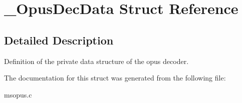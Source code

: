 \section{\-\_\-\-Opus\-Dec\-Data Struct Reference}
\label{struct__OpusDecData}


\subsection{Detailed Description}
Definition of the private data structure of the opus decoder. 

The documentation for this struct was generated from the following file\-:\begin{DoxyCompactItemize}
\item 
msopus.\-c\end{DoxyCompactItemize}
